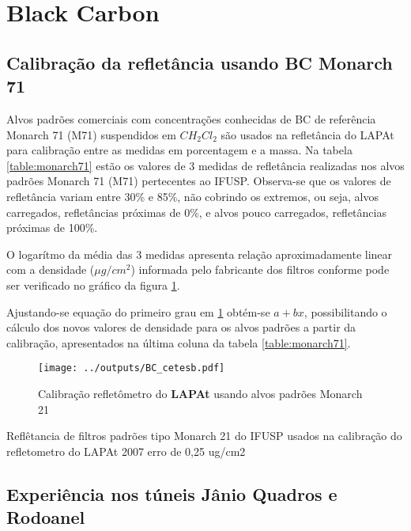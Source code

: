 \section{Black Carbon}

\subsection{Calibração da refletância usando BC Monarch 71}

Alvos padrões comerciais com concentrações conhecidas de BC de referência 
Monarch 71 (M71) suspendidos em $CH_2Cl_2$ \citep{clarke1986} são usados na 
refletância do LAPAt para calibração entre as medidas em porcentagem e a massa.
Na tabela \ref{table:monarch71} estão os valores de 3 medidas de refletância  
realizadas nos alvos padrões Monarch 71 (M71) pertecentes ao IFUSP.
Observa-se que os valores de refletância variam entre 30\% e 85\%, não cobrindo
os extremos, ou seja, alvos carregados, refletâncias próximas de 0\%, e alvos
pouco carregados, refletâncias próximas de 100\%.

O logarítmo da média das 3 medidas apresenta relação aproximadamente linear 
com a densidade ($\mu g /cm^2$) informada pelo fabricante dos filtros 
conforme pode ser verificado no gráfico da figura \ref{fig:monarch71}.

Ajustando-se equação do primeiro grau em \ref{fig:monarch71} obtém-se 
$a + bx$, possibilitando o cálculo dos novos valores de densidade para os 
alvos padrões a partir da calibração, apresentados na última coluna da tabela 
\ref{table:monarch71}.

\begin{figure}
  \centering
  \texttt{[image: ../outputs/BC\_cetesb.pdf]}
  \caption{Calibração refletômetro do \textbf{LAPAt} usando alvos padrões Monarch 21
         \label{fig:monarch71}}
\end{figure}

\newpage
\begin{table}
  \centering
  \small
    
    \caption{Reflêtancia de filtros padrões tipo Monarch 21 \citep{clarke1986} 
           do IFUSP usados na calibração do refletometro do 
           LAPAt 2007  erro de 0,25 ug/cm2 \label{table:monarch71}}
\end{table} 

\subsection{Experiência nos túneis Jânio Quadros e Rodoanel}

